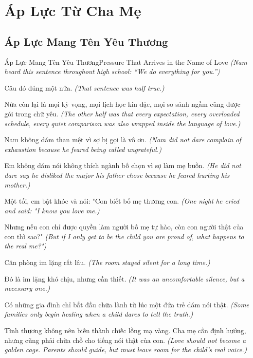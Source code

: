 \chapter{Áp Lực Từ Cha Mẹ}

\section{Áp Lực Mang Tên Yêu Thương}
\begin{truyen}{Áp Lực Mang Tên Yêu Thương}{Pressure That Arrives in the Name of Love}
\textit{(Nam heard this sentence throughout high school: ``We do everything for you.'')}

Câu đó đúng một nửa.
\textit{(That sentence was half true.)}

Nửa còn lại là mọi kỳ vọng, mọi lịch học kín đặc, mọi so sánh ngầm cũng được gói trong chữ yêu.
\textit{(The other half was that every expectation, every overloaded schedule, every quiet comparison was also wrapped inside the language of love.)}

Nam không dám than mệt vì sợ bị gọi là vô ơn.
\textit{(Nam did not dare complain of exhaustion because he feared being called ungrateful.)}

Em không dám nói không thích ngành bố chọn vì sợ làm mẹ buồn.
\textit{(He did not dare say he disliked the major his father chose because he feared hurting his mother.)}

Một tối, em bật khóc và nói: "Con biết bố mẹ thương con.
\textit{(One night he cried and said: "I know you love me.)}

Nhưng nếu con chỉ được quyền làm người bố mẹ tự hào, còn con người thật của con thì sao?"
\textit{(But if I only get to be the child you are proud of, what happens to the real me?")}

Căn phòng im lặng rất lâu.
\textit{(The room stayed silent for a long time.)}

Đó là im lặng khó chịu, nhưng cần thiết.
\textit{(It was an uncomfortable silence, but a necessary one.)}

Có những gia đình chỉ bắt đầu chữa lành từ lúc một đứa trẻ dám nói thật.
\textit{(Some families only begin healing when a child dares to tell the truth.)}

\end{truyen}

\begin{baihoc}
Tình thương không nên biến thành chiếc lồng mạ vàng. Cha mẹ cần định hướng, nhưng cũng phải chừa chỗ cho tiếng nói thật của con.
\textit{(Love should not become a golden cage. Parents should guide, but must leave room for the child’s real voice.)}
\end{baihoc}

